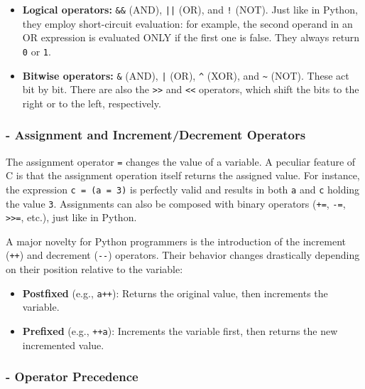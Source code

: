 \begin{itemize}
    \item[-] \textbf{Logical operators:} \texttt{\&\&} (AND), \texttt{||} (OR), and \texttt{!} (NOT). Just like in Python, they employ short-circuit evaluation: for example, the second operand in an OR expression is evaluated ONLY if the first one is false. They always return \texttt{0} or \texttt{1}.
    \item[-] \textbf{Bitwise operators:} \texttt{\&} (AND), \texttt{|} (OR), \texttt{\^} (XOR), and \texttt{\~{}} (NOT). These act bit by bit. There are also the \texttt{>>} and \texttt{<<} operators, which shift the bits to the right or to the left, respectively.
\end{itemize}



\subsubsection{- Assignment and Increment/Decrement Operators}

The assignment operator \texttt{=} changes the value of a variable. A peculiar feature of C is that the assignment operation itself returns the assigned value. For instance, the expression \texttt{c = (a = 3)} is perfectly valid and results in both \texttt{a} and \texttt{c} holding the value \texttt{3}.
Assignments can also be composed with binary operators (\texttt{+=}, \texttt{-=}, \texttt{>>=}, etc.), just like in Python.

A major novelty for Python programmers is the introduction of the increment (\texttt{++}) and decrement (\texttt{-{}-}) operators. Their behavior changes drastically depending on their position relative to the variable:
\begin{itemize}
    \item[-] \textbf{Postfixed} (e.g., \texttt{a++}): Returns the original value, then increments the variable.
    \item[-] \textbf{Prefixed} (e.g., \texttt{++a}): Increments the variable first, then returns the new incremented value.
\end{itemize}



\subsubsection{- Operator Precedence}

